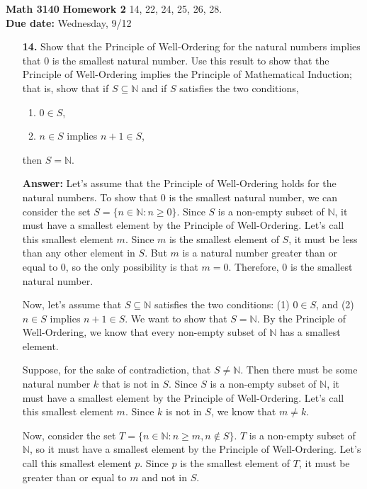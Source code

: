 \documentclass[12pt,reqno]{amsart}
\begin{document}
\thispagestyle{empty}

\noindent \textbf{Math 3140}  \hfill {\bf Homework 2}
\vskip1cm
  14, 22, 24, 25, 26, 28.  \\
{\bf Due date:} Wednesday, 9/12

\medskip

\begin{enumerate}

\item[{\bf 14.}]
Show that the Principle of Well-Ordering for the natural numbers implies that 0 is 
the smallest natural number.  Use this result to show that the Principle of 
Well-Ordering implies the Principle of Mathematical Induction; that is, show 
that if $S \subseteq {\mathbb N}$ and if $S$ satisfies the two conditions,
\begin{enumerate}
  \item $0 \in S$,
  \item $n \in S$ implies $n + 1 \in S$,
\end{enumerate}
then $S = \mathbb N$.  

\textbf{Answer:} Let's assume that the Principle of Well-Ordering holds for the natural numbers. To show that 0 is the smallest natural number, we can consider the set $S = \{n \in \mathbb{N} : n \geq 0\}$. Since $S$ is a non-empty subset of $\mathbb{N}$, it must have a smallest element by the Principle of Well-Ordering. Let's call this smallest element $m$. Since $m$ is the smallest element of $S$, it must be less than any other element in $S$. But $m$ is a natural number greater than or equal to 0, so the only possibility is that $m = 0$. Therefore, 0 is the smallest natural number.

Now, let's assume that $S \subseteq \mathbb{N}$ satisfies the two conditions: (1) $0 \in S$, and (2) $n \in S$ implies $n + 1 \in S$. We want to show that $S = \mathbb{N}$. By the Principle of Well-Ordering, we know that every non-empty subset of $\mathbb{N}$ has a smallest element. 

Suppose, for the sake of contradiction, that $S \neq \mathbb{N}$. Then there must be some natural number $k$ that is not in $S$. Since $S$ is a non-empty subset of $\mathbb{N}$, it must have a smallest element by the Principle of Well-Ordering. Let's call this smallest element $m$. Since $k$ is not in $S$, we know that $m \neq k$. 

Now, consider the set $T = \{n \in \mathbb{N} : n \geq m, n \notin S\}$. $T$ is a non-empty subset of $\mathbb{N}$, so it must have a smallest element by the Principle of Well-Ordering. Let's call this smallest element $p$. Since $p$ is the smallest element of $T$, it must be greater than or equal to $m$ and not in $S$. 


\end{enumerate}
\end{document}

